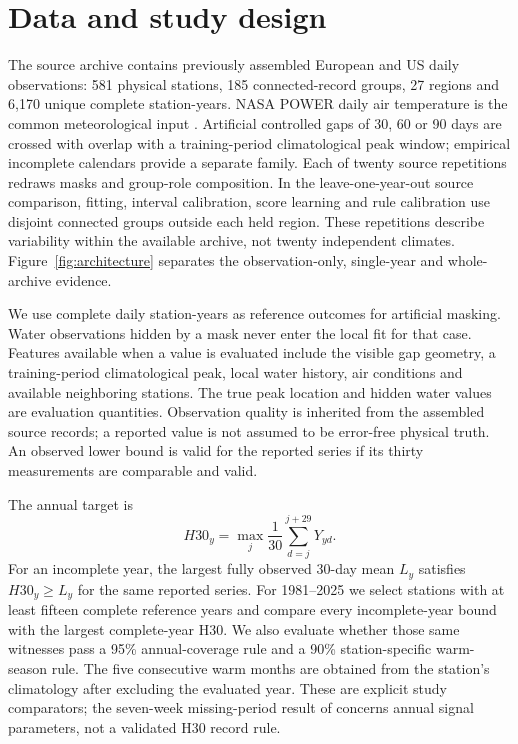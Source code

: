 \documentclass[draft,linenumbers]{agujournal2025}
\begin{document}
\section{Data and study design}
The source archive contains previously assembled European and US daily observations: 581 physical stations, 185 connected-record groups, 27 regions and 6,170 unique complete station-years. NASA POWER daily air temperature is the common meteorological input \cite{nasapower2026}. Artificial controlled gaps of 30, 60 or 90 days are crossed with overlap with a training-period climatological peak window; empirical incomplete calendars provide a separate family. Each of twenty source repetitions redraws masks and group-role composition. In the leave-one-year-out source comparison, fitting, interval calibration, score learning and rule calibration use disjoint connected groups outside each held region. These repetitions describe variability within the available archive, not twenty independent climates. Figure~\ref{fig:architecture} separates the observation-only, single-year and whole-archive evidence.

We use complete daily station-years as reference outcomes for artificial masking. Water observations hidden by a mask never enter the local fit for that case. Features available when a value is evaluated include the visible gap geometry, a training-period climatological peak, local water history, air conditions and available neighboring stations. The true peak location and hidden water values are evaluation quantities. Observation quality is inherited from the assembled source records; a reported value is not assumed to be error-free physical truth. An observed lower bound is valid for the reported series if its thirty measurements are comparable and valid.

The annual target is
\begin{equation}
 H30_y=\max_{j}\frac{1}{30}\sum_{d=j}^{j+29}Y_{yd}.
\end{equation}
For an incomplete year, the largest fully observed 30-day mean $L_y$ satisfies $H30_y\ge L_y$ for the same reported series. For 1981--2025 we select stations with at least fifteen complete reference years and compare every incomplete-year bound with the largest complete-year H30. We also evaluate whether those same witnesses pass a 95\% annual-coverage rule and a 90\% station-specific warm-season rule. The five consecutive warm months are obtained from the station's climatology after excluding the evaluated year. These are explicit study comparators; the seven-week missing-period result of  concerns annual signal parameters, not a validated H30 record rule.



\end{document}
